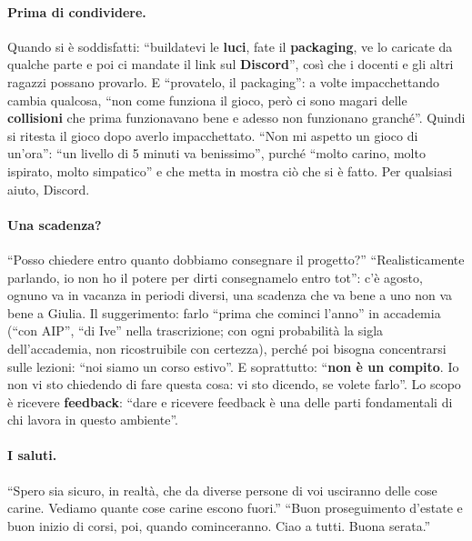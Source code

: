 \paragraph{Prima di condividere.} Quando si è soddisfatti: ``buildatevi le \textbf{luci}, fate
il \textbf{packaging}, ve lo caricate da qualche parte e poi ci mandate il link sul
\textbf{Discord}'', così che i docenti e gli altri ragazzi possano provarlo. E ``provatelo, il
packaging'': a volte impacchettando cambia qualcosa, ``non come funziona il gioco, però ci sono
magari delle \textbf{collisioni} che prima funzionavano bene e adesso non funzionano granché''.
Quindi si ritesta il gioco dopo averlo impacchettato. ``Non mi aspetto un gioco di un'ora'': ``un
livello di 5 minuti va benissimo'', purché ``molto carino, molto ispirato, molto simpatico'' e
che metta in mostra ciò che si è fatto. Per qualsiasi aiuto, Discord.

\paragraph{Una scadenza?} ``Posso chiedere entro quanto dobbiamo consegnare il progetto?''
``Realisticamente parlando, io non ho il potere per dirti consegnamelo entro tot'': c'è agosto,
ognuno va in vacanza in periodi diversi, una scadenza che va bene a uno non va bene a Giulia. Il
suggerimento: farlo ``prima che cominci l'anno'' in accademia (``con AIP'', ``di Ive'' nella
trascrizione; con ogni probabilità la sigla dell'accademia, non ricostruibile con certezza),
perché poi bisogna concentrarsi sulle lezioni: ``noi siamo un corso estivo''. E soprattutto:
``\textbf{non è un compito}. Io non vi sto chiedendo di fare questa cosa: vi sto dicendo, se
volete farlo''. Lo scopo è ricevere \textbf{feedback}: ``dare e ricevere feedback è una delle
parti fondamentali di chi lavora in questo ambiente''.

\paragraph{I saluti.} ``Spero sia sicuro, in realtà, che da diverse persone di voi usciranno
delle cose carine. Vediamo quante cose carine escono fuori.'' ``Buon proseguimento d'estate e buon
inizio di corsi, poi, quando cominceranno. Ciao a tutti. Buona serata.''

